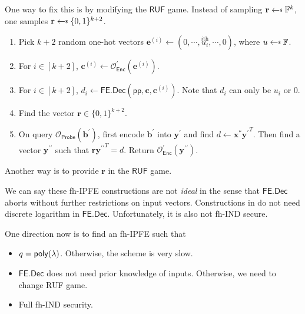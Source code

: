 One way to fix this is by modifying the $\textsf{RUF}$ game. Instead of sampling $\mathbf{r} \getsdollar \mathbb{F}^{k}$, one samples $\mathbf{r} \getsdollar \{0, 1\}^{k+2}$. 
\begin{enumerate}

\item Pick $k+2$ random one-hot vectors $\mathbf{e}^{(i)} \gets (0, \cdots, \overset{i\text{th}}{u_i}, \cdots, 0)$, where $u \getsdollar \mathbb{F}$.

\item For $i \in [k+2]$, $\mathbf{c}^{(i)} \gets \mathcal{O}^\prime_{\textsf{Enc}}(\mathbf{e}^{(i)})$.

\item For $i \in [k+2]$, $d_i \gets \textsf{FE.Dec}(\textsf{pp}, \mathbf{c}, \mathbf{c}^{(i)})$. Note that $d_i$ can only be $u_i$ or $0$.

\item Find the vector $\mathbf{r} \in \{0, 1\}^{k+2}$.

\item On query $\mathcal{O}_{\textsf{Probe}}(\mathbf{b}^\prime)$, first encode $\mathbf{b}^\prime$ into $\mathbf{y}^\prime$ and find $d \gets \mathbf{x}^{*}{\mathbf{y}^\prime}^T$. Then find a vector $\mathbf{y}^{\prime\prime}$ such that $\mathbf{r} {\mathbf{y}^{\prime\prime}}^T = d$. Return $\mathcal{O}^\prime_{\textsf{Enc}}(\mathbf{y}^{\prime\prime})$.

\end{enumerate}
Another way is to provide $\mathbf{r}$ in the $\textsf{RUF}$ game.

We can say these fh-IPFE constructions are not \emph{ideal} in the sense that $\textsf{FE.Dec}$ aborts without further restrictions on input vectors. Constructions in \cite{10.1007/978-3-030-90567-5_33} do not need discrete logarithm in $\textsf{FE.Dec}$. Unfortunately, it is also not \textsf{fh-IND} secure.

One direction now is to find an fh-IPFE such that

\begin{itemize}
	\item $q = \mathsf{poly}(\lambda)$. Otherwise, the scheme is very slow.

	\item $\textsf{FE.Dec}$ does not need prior knowledge of inputs. Otherwise, we need to change \textsf{RUF} game.
	
	\item Full \textsf{fh-IND} security.
\end{itemize}



